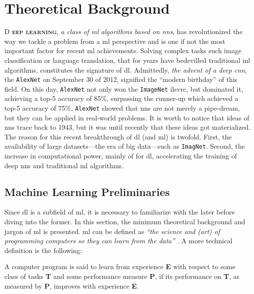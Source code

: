 \chapter{Theoretical Background}

\lettrine[depth=1, lines=4]{D}{\bfseries\color{Blue} eep learning}, \emph{a class of \gls{ml} algorithms based on
\glspl{nn}}, has revolutionized the way we tackle a problem from a \gls{ml}
perspective and is one if not the most important factor for recent \gls{ml}
achievements. Solving complex tasks such image classification or language translation, that for
years have bedevilled traditional \gls{ml} algorithms, constitutes the signature
of \gls{dl}. Admittedly, \emph{the advent of a deep
\gls{cnn}}, the \texttt{AlexNet}
\parencite{alexnet} on September 30 of 2012, signified the ``modern birthday''
of this field. On this day, \texttt{AlexNet} not only won the
\texttt{ImageNet} \parencite{Deng_2009} \gls{ilsvrc}, but dominated it,
achieving a top-5 accuracy of 85\%, surpassing the
runner-up which achieved a top-5 accuracy of 75\%. \texttt{AlexNet} showed that
\glspl{nn} are not merely a pipe-dream, but they can be applied in real-world
problems. It is worth to notice that ideas of \glspl{nn} trace back to 1943, but
it was until recently that these ideas got materialized. The reason for this
recent breakthrough of \gls{dl} (and \gls{ml}) is twofold. First, the
availability of large datasets---the era of big data---such as
\texttt{ImagNet}. Second, the increase in computational power,
mainly of  for \gls{dl}, accelerating the training of deep
\glspl{nn} and traditional \gls{ml} algorithms.

\section{Machine Learning Preliminaries}

Since \gls{dl} is a subfield of \gls{ml}, it is necessary to familiarize with
the later before diving into the former. In this section, the minimum
theoretical background and jargon of \gls{ml} is presented. \acrlong{ml} can be
defined as \emph{``the science and (art) of programming computers so they can
learn from the data''} \parencite{ml}. A more technical definition is the following:

\begin{definition}[name={Machine learning, \cite{mitchell}}]
	A computer program is said to learn from experience
	\textbf{E} with respect to some class of tasks \textbf{T} and some
	performance measure \textbf{P}, if its
	performance on \textbf{T}, as measured by \textbf{P}, improves with
	experience \textbf{E}.
\end{definition}

